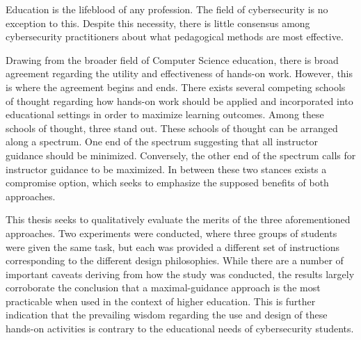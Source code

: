 
\providecommand{\heading}[1]{\section{#1}}
\providecommand{\subheading}[1]{\subsection{#1}}

Education is the lifeblood of any profession. 
The field of cybersecurity is no exception to this. %
Despite this necessity, there is little consensus among cybersecurity practitioners about what pedagogical methods are most effective.

Drawing from the broader field of Computer Science education, there is broad agreement regarding the utility and effectiveness of hands-on work. %
However, this is where the agreement begins and ends. %
There exists several competing schools of thought regarding how hands-on work should be applied and incorporated into educational settings in order to maximize learning outcomes. %
Among these schools of thought, three stand out. %
These schools of thought can be arranged along a spectrum. %
One end of the spectrum suggesting that all instructor guidance should be minimized. %
Conversely, the other end of the spectrum calls for instructor guidance to be maximized. %
In between these two stances exists a compromise option, which seeks to emphasize the supposed benefits of both approaches.

This thesis seeks to qualitatively evaluate the merits of the three aforementioned approaches. %
Two experiments were conducted, where three groups of students were given the same task, but each was provided a different set of instructions corresponding to the different design philosophies. %
While there are a number of important caveats deriving from how the study was conducted, the results largely corroborate the conclusion that a maximal-guidance approach is the most practicable when used in the context of higher education. %
This is further indication that the prevailing wisdom regarding the use and design of these hands-on activities is contrary to the educational needs of cybersecurity students. 

